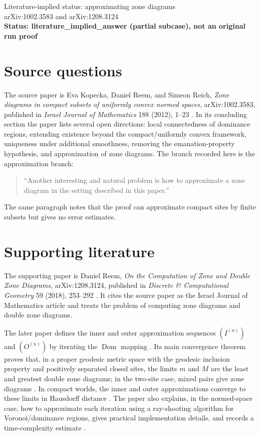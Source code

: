 \documentclass[11pt]{article}
\newcommand{\Dom}{\operatorname{Dom}}
\begin{document}
\begin{center}
{\Large Literature-implied status: approximating zone diagrams}\\[0.4em]
{\large arXiv:1002.3583 and arXiv:1208.3124}\\[0.6em]
\textbf{Status: literature\_implied\_answer (partial subcase), not an original run proof}
\end{center}

\section*{Source questions}

The source paper is Eva Kopecka, Daniel Reem, and Simeon Reich,
\emph{Zone diagrams in compact subsets of uniformly convex normed spaces},
arXiv:1002.3583, published in \emph{Israel Journal of Mathematics} 188
(2012), 1--23 \cite{KRR2012}. In its concluding section the paper lists
several open directions: local connectedness of dominance regions, extending
existence beyond the compact/uniformly convex framework, uniqueness under
additional smoothness, removing the emanation-property hypothesis, and
approximation of zone diagrams. The branch recorded here is the approximation
branch:
\begin{quote}
``Another interesting and natural problem is how to approximate a zone diagram
in the setting described in this paper.'' \cite[Sec.~6]{KRR2012}
\end{quote}
The same paragraph notes that the proof can approximate compact sites by finite
subsets but gives no error estimates.

\section*{Supporting literature}

The supporting paper is Daniel Reem, \emph{On the Computation of Zone and
Double Zone Diagrams}, arXiv:1208.3124, published in \emph{Discrete \&
Computational Geometry} 59 (2018), 253--292 \cite{Reem2018}. It cites the
source paper as the Israel Journal of Mathematics article and treats the
problem of computing zone diagrams and double zone diagrams.

The later paper defines the inner and outer approximation sequences
$(I^{(n)})$ and $(O^{(n)})$ by iterating the $\Dom$ mapping
\cite[Algorithm~3.2]{Reem2018}. Its main convergence theorem proves that, in a
proper geodesic metric space with the geodesic inclusion property and positively
separated closed sites, the limits $m$ and $M$ are the least and greatest double
zone diagrams; in the two-site case, mixed pairs give zone diagrams
\cite[Theorem~4.3]{Reem2018}. In compact worlds, the inner and outer
approximations converge to these limits in Hausdorff distance
\cite[Corollary~4.4]{Reem2018}. The paper also explains, in the normed-space
case, how to approximate each iteration using a ray-shooting algorithm for
Voronoi/dominance regions, gives practical implementation details, and records
a time-complexity estimate \cite[Sec.~6]{Reem2018}.
\end{document}
